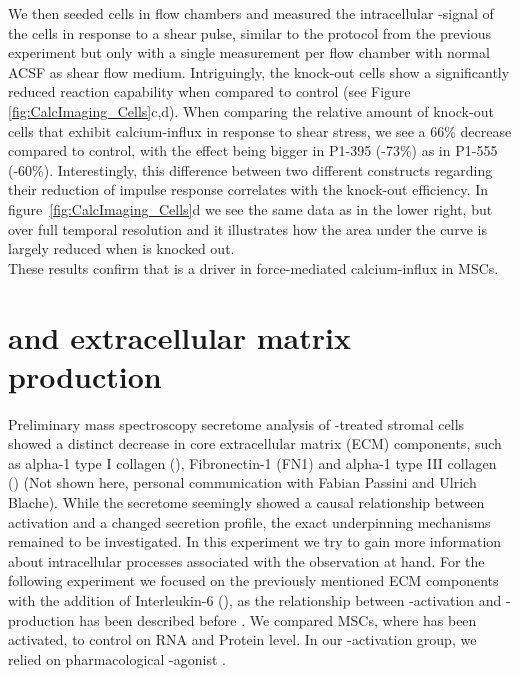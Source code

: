 We then seeded cells in flow chambers and measured the intracellular \calcium{}-signal of the cells in response to a shear pulse, similar to the protocol from the previous experiment but only with a single measurement per flow chamber with normal ACSF as shear flow medium. Intriguingly, the \PiezoGene{} knock-out cells show a significantly reduced reaction capability when compared to control (see Figure \ref{fig:CalcImaging_Cells}c,d). When comparing the relative amount of knock-out cells that exhibit calcium-influx in response to shear stress, we see a 66\% decrease compared to control, with the effect being bigger in P1-395 (-73\%) as in P1-555 (-60\%). Interestingly, this difference between two different constructs regarding their reduction of impulse response correlates with the knock-out efficiency. In figure~\ref{fig:CalcImaging_Cells}d we see the same data as in the lower right, but over full temporal resolution and it illustrates how the area under the curve is largely reduced when \Piezo{} is knocked out. \\

These results confirm that \Piezo{} is a driver in force-mediated calcium-influx in MSCs.


\section{\Piezo{} and extracellular matrix production}
\label{sec:PiezoandECM}

Preliminary mass spectroscopy secretome analysis of \Yoda-treated stromal cells showed a distinct decrease in core extracellular matrix (ECM) components, such as alpha-1 type I collagen (\colone), Fibronectin-1 (FN1) and alpha-1 type III collagen (\colthree) (Not shown here, personal communication with Fabian Passini and Ulrich Blache). While the secretome seemingly showed a causal relationship between \Piezo{} activation and a changed secretion profile, the exact underpinning mechanisms remained to be investigated. In this experiment we try to gain more information about intracellular processes associated with the observation at hand. For the following experiment we focused on the previously mentioned ECM components with the addition of Interleukin-6 (\IL{}), as the relationship between \Piezo{}-activation and \IL{}-production has been described before \cite{Blythe2019}. We  compared MSCs, where \Piezo{} has been activated, to control on RNA and Protein level. In our \Piezo{}-activation group, we relied on pharmacological \Piezo{}-agonist \Yoda{}.\par


